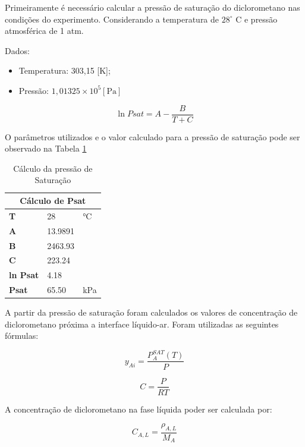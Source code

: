 Primeiramente é necessário calcular a pressão de saturação do diclorometano nas condições do experimento. Considerando a temperatura de $28 ^{\circ}$ C e pressão atmosférica de 1 atm.

Dados:

\begin{itemize}
	\item Temperatura: 303,15 [K];
	\item Pressão: $1,01325 \times 10^{5} [\mathrm{Pa}]$
\end{itemize}

\begin{equation}\label{key}
\ln P s a t=A-\frac{B}{T+C}
\end{equation}

O parâmetros utilizados e o valor calculado para a pressão de saturação pode ser observado na Tabela \ref{tab:sat}

\begin{table}[H]
	\centering
	\begin{tabular}{|l|l|l|}
		\hline
		\multicolumn{3}{|c|}{\textbf{Cálculo de Psat}} \\ \hline
		\textbf{T} & 28 & °C \\ \hline
		\textbf{A} & 13.9891 &  \\ \hline
		\textbf{B} & 2463.93 &  \\ \hline
		\textbf{C} & 223.24 &  \\ \hline
		\textbf{ln Psat} & 4.18 &  \\ \hline
		\textbf{Psat} & 65.50 & kPa \\ \hline
	\end{tabular}
	\caption{Cálculo da pressão de Saturação}
	\label{tab:sat}
\end{table}

A partir da pressão de saturação foram calculados os valores de concentração de diclorometano próxima a interface líquido-ar. Foram utilizadas as seguintes fórmulas:

\begin{equation}\label{key}
y_{A i}=\frac{P_{A}^{SAT}(T)}{P}
\end{equation}

\begin{equation}\label{key}
C=\frac{P}{R T}
\end{equation}

A concentração de diclorometano na fase líquida poder ser calculada por:

\begin{equation}\label{key}
C_{A, L}=\frac{\rho_{A, L}}{M_{A}}
\end{equation}

